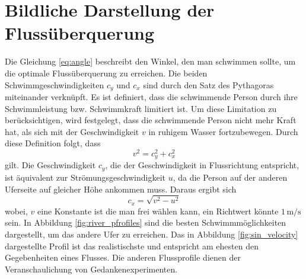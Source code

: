 %
%
%
%
\section{Bildliche Darstellung der Flussüberquerung
\label{schwimmen:section:bildliche_darstellung}}



Die Gleichung \ref{eq:angle} beschreibt den Winkel, den man schwimmen sollte, um die optimale Flussüberquerung zu erreichen. Die beiden Schwimmgeschwindigkeiten \(c_y\) und \(c_x\) sind durch den Satz des Pythagoras miteinander verknüpft. Es ist definiert, dass die schwimmende Person durch ihre Schwimmleistung bzw. Schwimmkraft limitiert ist. Um diese Limitation zu berücksichtigen, wird festgelegt, dass die schwimmende Person nicht mehr Kraft hat, als sich mit der Geschwindigkeit \(v\) in ruhigem Wasser fortzubewegen. Durch diese Definition folgt, dass
\begin{equation}
    v^2 = c_y^2 + c_x^2
\end{equation}
gilt. Die Geschwindigkeit \(c_y\), die der Geschwindigkeit in Flussrichtung entspricht, ist äquivalent zur Strömungsgeschwindigkeit \(u\), da die Person auf der anderen Uferseite auf gleicher Höhe ankommen muss. Daraus ergibt sich
\begin{equation}
    c_x = \sqrt{v^2 - u^2}
\end{equation}
wobei, \(v\) eine Konstante ist die man frei wählen kann, ein Richtwert könnte \(1\,\mathrm{m/s}\) sein.
In Abbildung \ref{fig:river_pfrofiles} sind die besten Schwimmmöglichkeiten dargestellt, um das andere Ufer zu erreichen. Das in Abbildung \ref{fig:sin_velocity} dargestellte Profil ist das realistischste und entspricht am ehesten den Gegebenheiten eines Flusses. Die anderen Flussprofile dienen der Veranschaulichung von Gedankenexperimenten.

